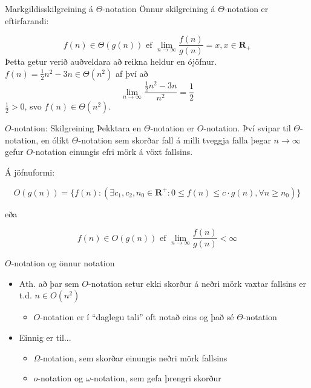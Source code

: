 \documentclass{beamer}
\begin{document}
\begin{frame}{Markgildisskilgreining á $\Theta$-notation}
Önnur skilgreining á $\Theta$-notation er eftirfarandi:

\[
  f(n) \in \Theta(g(n)) \text{ ef } \lim_{n\to \infty}\frac{f(n)}{g(n)} = x, x \in \mathbf{R_+}
\]
Þetta getur verið auðveldara að reikna heldur en ójöfnur. $f(n) = \frac{1}{2}n^2 - 3n \in \Theta(n^2)$ af því að
\[
 \lim_{n\to \infty} \frac{\frac{1}{2}n^2 - 3n}{n^2} = \frac{1}{2}
\]
$\frac{1}{2} > 0$, svo $f(n) \in \Theta(n^2)$.
\end{frame}


\begin{frame}{$O$-notation: Skilgreining}
Þekktara en $\Theta$-notation er $O$-notation. Því svipar til $\Theta$-notation, en ólíkt $\Theta$-notation sem skorðar fall á milli tveggja falla þegar $n \to \infty$ gefur $O$-notation einungis efri mörk á vöxt fallsins.

Á jöfnuformi:

\[O(g(n)) = \{ f(n) : (\exists c_1, c_2, n_0 \in \mathbf{R}^+ : 0 \leq f(n) \leq c\cdot g(n), \forall n \geq n_0 )\}\]

eða

\[
  f(n) \in O(g(n)) \text{ ef } \lim_{n\to \infty}\frac{f(n)}{g(n)} < \infty
\]
\end{frame}


\begin{frame}{$O$-notation og önnur notation}
\begin{itemize}
 \item Ath. að þar sem $O$-notation setur ekki skorður á neðri mörk vaxtar fallsins er t.d. $n \in O(n^2)$
 \begin{itemize}
  \item $O$-notation er í ``daglegu tali'' oft notað eins og það sé $\Theta$-notation
 \end{itemize}
 \item Einnig er til...
 \begin{itemize}
  \item $\Omega$-notation, sem skorðar einungis neðri mörk fallsins
  \item $o$-notation og $\omega$-notation, sem gefa þrengri skorður
 \end{itemize}
\end{itemize}
\end{frame}
\end{document}
